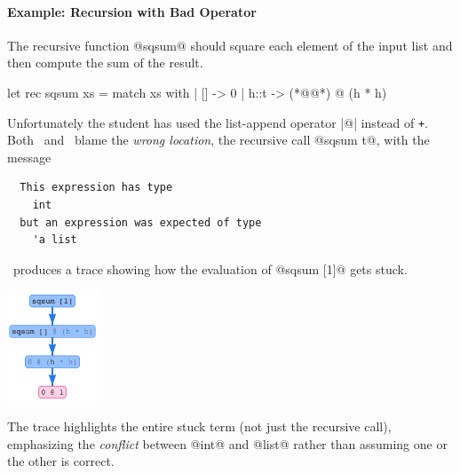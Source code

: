 \paragraph{Example: Recursion with Bad Operator}
The recursive function @sqsum@ should square each
element of the input list and then compute the sum
of the result.
%
\begin{ecode}
  let rec sqsum xs = match xs with
    | [] -> 0
    | h::t -> (*@@*) @ (h * h)
\end{ecode}
%
Unfortunately the student has used the list-append
operator |@| instead of \texttt{+}. %
%
Both \ocaml\ and \sherrloc\ blame the \emph{wrong location},
the recursive call @sqsum t@, with the message
%
\begin{verbatim}
  This expression has type
    int
  but an expression was expected of type
    'a list
\end{verbatim}
%
\toolname\ produces a trace showing how the evaluation of
@sqsum [1]@ gets stuck.
%
\begin{center}
  \includegraphics[height=125px]{nanomaly/sqsum.png}
\end{center}
%
The trace highlights the entire stuck term
(not just the recursive call), emphasizing
the \emph{conflict} between @int@ and @list@
rather than assuming one or the other is correct.

